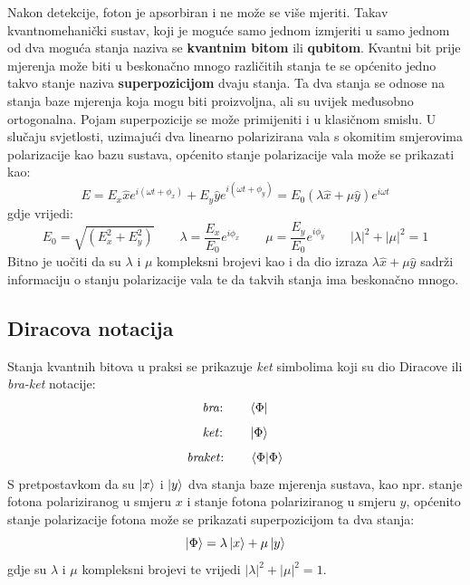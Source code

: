 Nakon detekcije, foton je apsorbiran i ne može se više mjeriti. Takav kvantnomehanički sustav, koji je moguće samo jednom izmjeriti u samo jednom od dva moguća stanja naziva se \textbf{kvantnim bitom} ili \textbf{qubitom}.
Kvantni bit prije mjerenja može biti u beskonačno mnogo različitih stanja te se općenito jedno takvo stanje naziva \textbf{superpozicijom} dvaju stanja. Ta dva stanja se odnose na stanja baze mjerenja koja mogu biti proizvoljna, ali su uvijek međusobno ortogonalna. Pojam superpozicije se može primijeniti i u klasičnom smislu. U slučaju svjetlosti, uzimajući dva linearno polarizirana vala s okomitim smjerovima polarizacije kao bazu sustava, općenito stanje polarizacije vala može se prikazati kao:
\begin{equation}
E = E_x \hat{x}e^{i(\omega t + \phi_x)} + E_y \hat{y}e^{i(\omega t + \phi_y)} = E_0(\lambda \hat{x} + \mu \hat{y})e^{i\omega t}
\end{equation}
gdje vrijedi:
\begin{equation}
E_0 = \sqrt{(E_x^2 + E_y^2)}
\qquad
\lambda = \frac{E_x}{E_0}e^{i\phi_x}
\qquad
\mu = \frac{E_y}{E_0}e^{i\phi_y}
\qquad
|\lambda|^2 + |\mu|^2 = 1
\end{equation}
Bitno je uočiti da su $\lambda$ i $\mu$ kompleksni brojevi kao i da dio izraza $\lambda\hat{x}+\mu\hat{y}$ sadrži informaciju o stanju polarizacije vala te da takvih stanja ima beskonačno mnogo.

\subsection{Diracova notacija}
Stanja kvantnih bitova u praksi se prikazuje \textit{ket} simbolima koji su dio Diracove ili \textit{bra-ket} notacije:
\[
\text{\textit{bra}:}
\qquad
\bra{\Phi}
\]
\[
\text{\textit{ket}:}
\qquad
\ket{\Phi}
\]
\[
\text{\textit{braket}:}
\qquad
\braket{\Phi|\Phi}
\]
S pretpostavkom da su $\ket{x}$ i $\ket{y}$ dva stanja baze mjerenja sustava, kao npr. stanje fotona polariziranog u smjeru $x$ i stanje fotona polariziranog u smjeru $y$, općenito stanje polarizacije fotona može se prikazati superpozicijom ta dva stanja:
\begin{equation}
\ket{\Phi} = \lambda\ket{x} + \mu\ket{y}
\end{equation}
gdje su $\lambda$ i $\mu$ kompleksni brojevi te vrijedi $|\lambda|^2 + |\mu|^2 = 1$.

